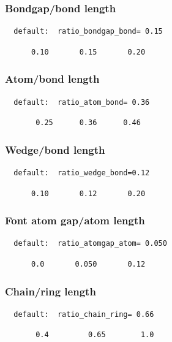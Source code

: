 \documentclass[a4paper]{article}
\makeatletter
\def\MCFstructure{\hspace{5mm}{\@strufont\char\fontnum}\advance\fontnum\@ne\relax}%
\makeatother
\begin{document}
\subsubsection{Bondgap/bond length}
\begin{verbatim}
  default:  ratio_bondgap_bond= 0.15
\end{verbatim}
\MCFstructure
\vspace{-3mm}%
\begin{verbatim}
      0.10       0.15       0.20
\end{verbatim}
\subsubsection{Atom/bond length}
\begin{verbatim}
  default:  ratio_atom_bond= 0.36
\end{verbatim}
\MCFstructure
\vspace{-3mm}%
\begin{verbatim}
       0.25      0.36      0.46
\end{verbatim}
\subsubsection{Wedge/bond length}
\begin{verbatim}
  default:  ratio_wedge_bond=0.12
\end{verbatim}
\MCFstructure
\vspace{-3mm}%
\begin{verbatim}
      0.10       0.12       0.20
\end{verbatim}
\subsubsection{Font atom gap/atom length}
\begin{verbatim}
  default:  ratio_atomgap_atom= 0.050
\end{verbatim}
\MCFstructure
\vspace{-3mm}%
\begin{verbatim}
      0.0       0.050       0.12
\end{verbatim}
\subsubsection{Chain/ring length}
\begin{verbatim}
  default:  ratio_chain_ring= 0.66
\end{verbatim}
\MCFstructure
\vspace{-3mm}%
\begin{verbatim}
       0.4         0.65        1.0
\end{verbatim}
\end{document}
